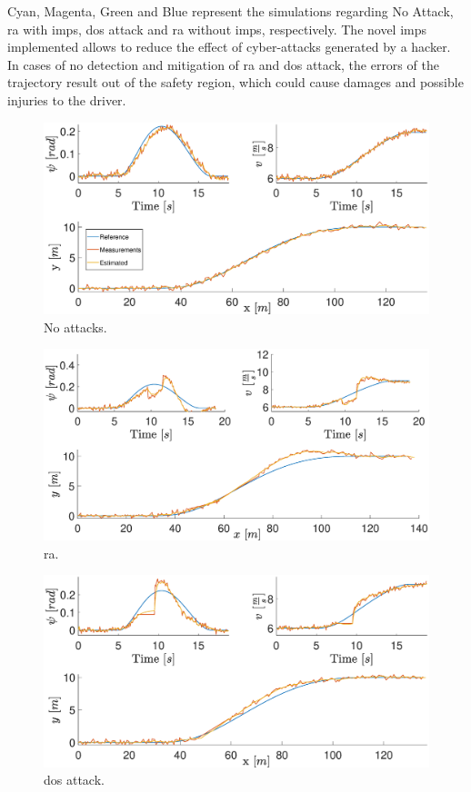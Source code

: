 Cyan, Magenta, Green and Blue represent the simulations regarding No Attack, \gls{ra} with \gls{imps}, \gls{dos} attack and \gls{ra} without \gls{imps}, respectively. The novel \gls{imps} implemented allows to reduce the effect of cyber-attacks generated by a hacker. In cases of no detection and mitigation of \gls{ra} and \gls{dos} attack, the errors of the trajectory result out of the safety region, which could cause damages and possible injuries to the driver.
%
\begin{figure}
	\centering
	\includegraphics[scale=0.4]{figure/Part2/Chapter6/Figures/MPC.eps}
	\caption{No attacks.}
	\label{fig:no_attack}
\end{figure}
%
\begin{figure}
	\centering
	\includegraphics[scale=0.4]{figure/Part2/Chapter6/Figures/MPC_Replay.eps}
	\caption{\gls{ra}.}
	\label{fig:MPC_RA}
\end{figure}
%
\begin{figure}
	\centering
	\includegraphics[scale=0.4]{figure/Part2/Chapter6/Figures/MPC_DoS.eps}
	\caption{\gls{dos} attack.}
	\label{fig:MPC_dos}
\end{figure}

